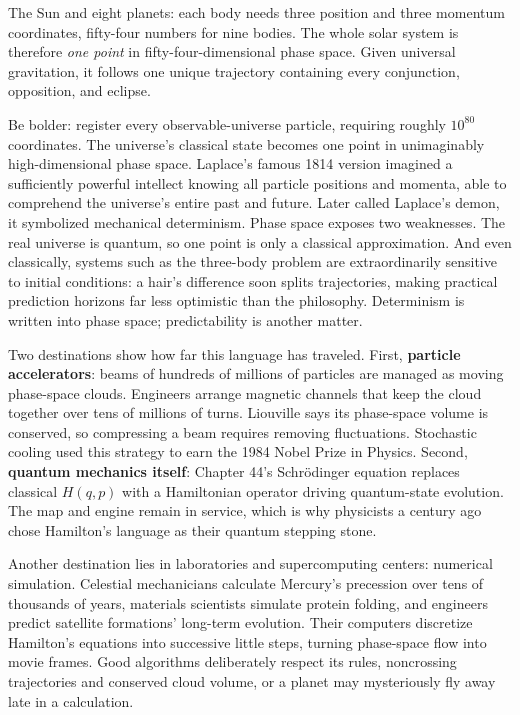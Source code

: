 
\begin{thought}
The Sun and eight planets: each body needs three position and three momentum coordinates, fifty-four numbers for nine bodies. The whole solar system is therefore \emph{one point} in fifty-four-dimensional phase space. Given universal gravitation, it follows one unique trajectory containing every conjunction, opposition, and eclipse.

Be bolder: register every observable-universe particle, requiring roughly \(10^{80}\) coordinates. The universe's classical state becomes one point in unimaginably high-dimensional phase space. Laplace's famous 1814 version imagined a sufficiently powerful intellect knowing all particle positions and momenta, able to comprehend the universe's entire past and future. Later called Laplace's demon, it symbolized mechanical determinism. Phase space exposes two weaknesses. The real universe is quantum, so one point is only a classical approximation. And even classically, systems such as the three-body problem are extraordinarily sensitive to initial conditions: a hair's difference soon splits trajectories, making practical prediction horizons far less optimistic than the philosophy. Determinism is written into phase space; predictability is another matter.
\end{thought}

Two destinations show how far this language has traveled. First, \textbf{particle accelerators}: beams of hundreds of millions of particles are managed as moving phase-space clouds. Engineers arrange magnetic channels that keep the cloud together over tens of millions of turns. Liouville says its phase-space volume is conserved, so compressing a beam requires removing fluctuations. Stochastic cooling used this strategy to earn the 1984 Nobel Prize in Physics. Second, \textbf{quantum mechanics itself}: Chapter 44's Schrödinger equation replaces classical \(H(q,p)\) with a Hamiltonian operator driving quantum-state evolution. The map and engine remain in service, which is why physicists a century ago chose Hamilton's language as their quantum stepping stone.

Another destination lies in laboratories and supercomputing centers: numerical simulation. Celestial mechanicians calculate Mercury's precession over tens of thousands of years, materials scientists simulate protein folding, and engineers predict satellite formations' long-term evolution. Their computers discretize Hamilton's equations into successive little steps, turning phase-space flow into movie frames. Good algorithms deliberately respect its rules, noncrossing trajectories and conserved cloud volume, or a planet may mysteriously fly away late in a calculation.

